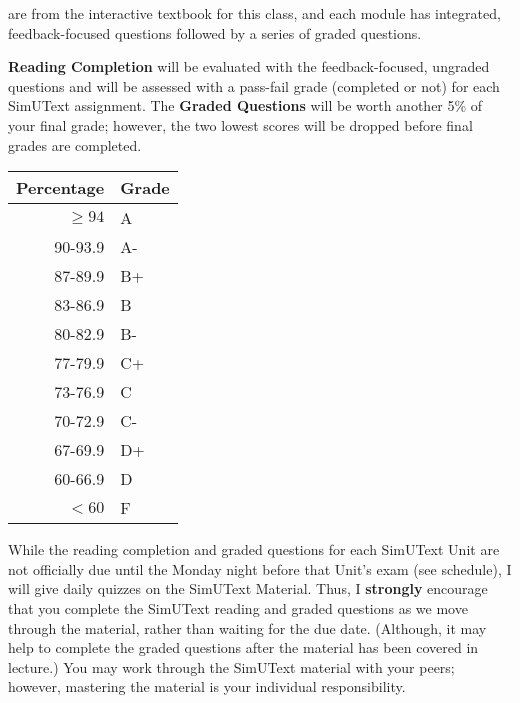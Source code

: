 \documentclass{tufte-handout}
\begin{document}
 are from the interactive textbook for this class, and each module has integrated, feedback-focused questions followed by a series of graded questions. 

\textbf{Reading Completion} will be evaluated with the feedback-focused, ungraded questions and will be assessed with a pass-fail grade (completed or not) for each SimUText assignment. The \textbf{Graded Questions} will be worth another 5\% of your final grade; however, the two lowest scores will be dropped before final grades are completed. 

\begin{margintable}
\begin{tabular}{rl}
Percentage & Grade \\
\hline 
$\ge94$ & A \\
90-93.9 & A- \\
87-89.9 & B+ \\
83-86.9 & B \\
80-82.9 & B- \\
77-79.9 & C+ \\
73-76.9 & C \\
70-72.9 & C- \\
67-69.9 & D+ \\
60-66.9 & D \\
$<60$ & F \\
\hline
\end{tabular}
\end{margintable}


While the reading completion and graded questions for each SimUText Unit are not officially due until the Monday night before that Unit's exam (see schedule), I will give daily quizzes on the SimUText Material. Thus, I \textbf{strongly} encourage that you complete the SimUText reading and graded questions as we move through the material, rather than waiting for the due date. (Although, it may help to complete the graded questions after the material has been covered in lecture.)  You may work through the SimUText material with your peers; however, mastering the material is your individual responsibility.
\end{document}
